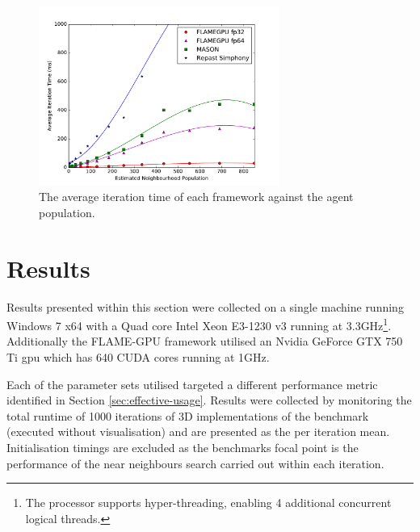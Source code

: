\begin{figure}[tb]
\begin{center}
    \includegraphics[width=0.7\textwidth]{../resources/problemscale_graph/graph.pdf}
    \caption{\label{fig:graph-agent-pop}The average iteration time of each framework against the agent population.}
\end{center}
\end{figure}
\section{Results\label{sec:results}}

  Results presented within this section were collected on a single machine running Windows 7 x64 with a Quad core Intel Xeon E3-1230 v3 running at 3.3GHz\footnote{The processor supports hyper-threading, enabling 4 additional concurrent logical threads.}. Additionally the FLAME-GPU framework utilised an Nvidia GeForce GTX 750 Ti \gls{gpu} which has 640 CUDA cores running at 1GHz.
  
  Each of the parameter sets utilised targeted a different performance metric identified in Section \ref{sec:effective-usage}. Results were collected by monitoring the total runtime of 1000 iterations of 3D implementations of the benchmark (executed without visualisation) and are presented as the per iteration mean. Initialisation timings are excluded as the benchmarks focal point is the performance of the near neighbours search carried out within each iteration.
  
